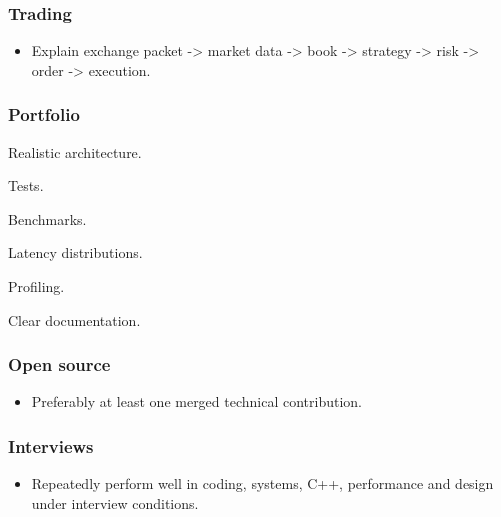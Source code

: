 \documentclass[11pt,letterpaper]{article}
\begin{document}
\subsubsection*{Trading}

\begin{itemize}

\item Explain exchange packet -> market data -> book -> strategy -> risk -> order -> execution.

\end{itemize}

\subsubsection*{Portfolio}

\begin{topics}

\item Realistic architecture.

\item Tests.

\item Benchmarks.

\item Latency distributions.

\item Profiling.

\item Clear documentation.

\end{topics}

\subsubsection*{Open source}

\begin{itemize}

\item Preferably at least one merged technical contribution.

\end{itemize}

\subsubsection*{Interviews}

\begin{itemize}

\item Repeatedly perform well in coding, systems, C++, performance and design under interview conditions.

\end{itemize}
\end{document}
